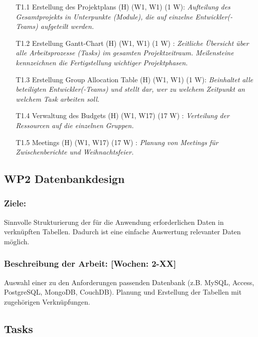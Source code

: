 \documentclass{report}
\begin{document}
\begin{enumerate}
\item [T1.1] Erstellung des Projektplans (H) (W1, W1) (1 W): \emph{ Aufteilung des Gesamtprojekts in Unterpunkte (Module), die auf einzelne Entwickler(-Teams) aufgeteilt werden.}
\item [T1.2] Erstellung Gantt-Chart (H) (W1, W1) (1 W) : \emph{ Zeitliche Übersicht über alle Arbeitsprozesse (Tasks) im gesamten Projektzeitraum. Meilensteine kennzeichnen die Fertigstellung wichtiger Projektphasen.}
\item [T1.3] Erstellung Group Allocation Table (H) (W1, W1) (1 W): \emph{ Beinhaltet alle beteiligten Entwickler(-Teams) und stellt dar, wer zu welchem Zeitpunkt an welchem Task arbeiten soll.}
\item [T1.4] Verwaltung des Budgets (H) (W1, W17) (17 W) : \emph{Verteilung der Ressourcen auf die einzelnen Gruppen.}
\item [T1.5] Meetings (H) (W1, W17) (17 W) : \emph{Planung von Meetings für Zwischenberichte und Weihnachtsfeier.}
\end{enumerate}

\subsection*{WP2 Datenbankdesign}

\subsubsection{Ziele:} Sinnvolle Strukturierung der für die Anwendung erforderlichen Daten in verknüpften Tabellen. Dadurch ist eine einfache Auswertung relevanter Daten möglich.
\subsubsection{Beschreibung der Arbeit: [Wochen: 2-XX]} Auswahl einer zu den Anforderungen passenden Datenbank (z.B. MySQL, Access, PostgreSQL, MongoDB, CouchDB). Planung und Erstellung der Tabellen mit zugehörigen Verknüpfungen.


\subsection*{Tasks}
\end{document}
